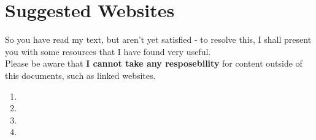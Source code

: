 \chapter{Suggested Websites}

So you have read my text, but aren't yet satisfied - to resolve this, I shall present you with some resources that I have found very useful.
\\
Please be aware that \textbf{I cannot take any resposebility} for content outside of this documents, such as linked websites.

\begin{enumerate}
	\item 
	\item
	\item
	\item
\end{enumerate}

